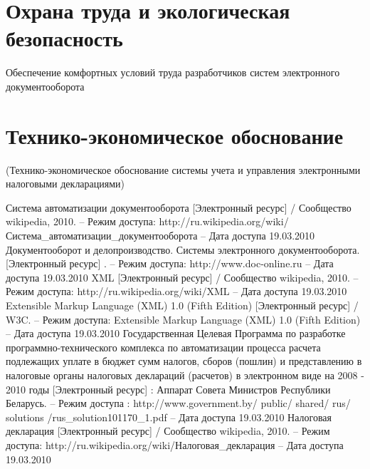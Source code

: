 \documentclass[14pt,a4paper]{reportmod}
\begin{document}
\chapter*{Охрана труда и экологическая безопасность}
Обеспечение комфортных условий труда разработчиков систем электронного документооборота


\chapter*{Технико-экономическое обоснование}
(Технико-экономическое обоснование системы учета и управления электронными налоговыми декларациями)


\begin{thebibliography}{99}
 Система автоматизации документооборота [Электронный ресурс] / Сообщество wikipedia, 2010. -- Режим доступа: http://ru.wikipedia.org/wiki/Система\_автоматизации\_документооборота -- Дата доступа 19.03.2010
 Документооборот и делопроизводство. Системы электронного документооборота. [Электронный ресурс] . -- Режим доступа: http://www.doc-online.ru -- Дата доступа 19.03.2010
 XML [Электронный ресурс] / Сообщество wikipedia, 2010. -- Режим доступа: http://ru.wikipedia.org/wiki/XML -- Дата доступа 19.03.2010
 Extensible Markup Language (XML) 1.0 (Fifth Edition) [Электронный ресурс] / W3C. -- Режим доступа: Extensible Markup Language (XML) 1.0 (Fifth Edition) -- Дата доступа 19.03.2010
 Государственная Целевая Программа по разработке программно-технического комплекса по автоматизации процесса расчета подлежащих уплате в бюджет сумм налогов, сборов (пошлин) и представлению в налоговые органы налоговых деклараций (расчетов) в электронном виде на 2008 - 2010 годы [Электронный ресурс] : Аппарат Совета Министров Республики Беларусь. -- Режим доступа : http://www.government.by/ public/ shared/ rus/ solutions /rus\_solution101170\_1.pdf -- Дата доступа 19.03.2010
 Налоговая декларация [Электронный ресурс] / Сообщество wikipedia, 2010. -- Режим доступа: http://ru.wikipedia.org/wiki/Налоговая\_декларация -- Дата доступа 19.03.2010

\end{thebibliography}
\end{document}
